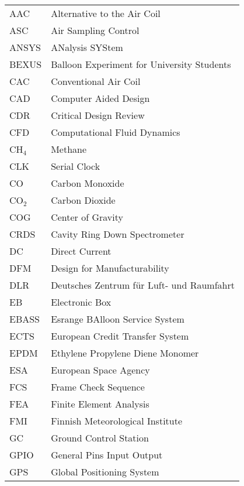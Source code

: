   
    \begin{longtable}{p{3cm} p{9cm}}
            AAC         & Alternative to the Air Coil\\
            ASC         & Air Sampling Control\\
            ANSYS       & ANalysis SYStem\\
            BEXUS       & Balloon Experiment for University Students\\
            CAC         & Conventional Air Coil\\
            CAD         & Computer Aided Design \\
            CDR         & Critical Design Review\\
            CFD         & Computational Fluid Dynamics\\
            CH$_{4}$    & Methane\\
            CLK         & Serial Clock\\
            CO          & Carbon Monoxide\\
            CO$_{2}$    & Carbon Dioxide\\
            COG         & Center of Gravity \\
            CRDS        & Cavity Ring Down Spectrometer\\
            DC          & Direct Current\\
            DFM         & Design for Manufacturability \\
            DLR         & Deutsches Zentrum f{\"u}r Luft- und Raumfahrt \\
            EB          & Electronic Box \\
            EBASS       & Esrange BAlloon Service System\\
            ECTS        & European Credit Transfer System\\
            EPDM        & Ethylene Propylene Diene Monomer\\
            ESA         & European Space Agency \\
            FCS         & Frame Check Sequence\\
            FEA         & Finite Element Analysis\\
            FMI         & Finnish Meteorological Institute\\
            GC          & Ground Control Station\\
            GPIO        & General Pins Input Output\\
            GPS         & Global Positioning System\\

\end{longtable}
